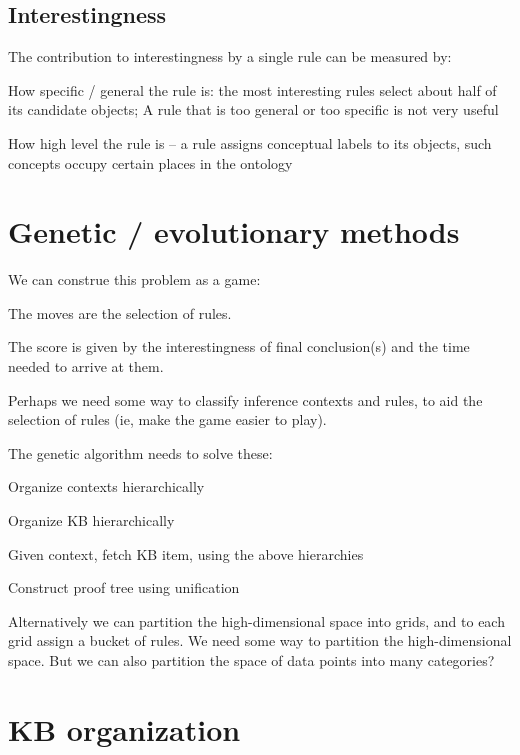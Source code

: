 \subsection{Interestingness}

The contribution to interestingness by a single rule can be measured by:
\begin{compactenum-}
\item How specific / general the rule is:  the most interesting rules select about half of its candidate objects;  A rule that is too general or too specific is not very useful
\item How high level the rule is -- a rule assigns conceptual labels to its objects, such concepts occupy certain places in the ontology
\end{compactenum-}

\section{Genetic / evolutionary methods}

We can construe this problem as a game:
\begin{compactenum-}
\item The moves are the selection of rules.
\item The score is given by the interestingness of final conclusion(s) and the time needed to arrive at them.
\item Perhaps we need some way to classify inference contexts and rules, to aid the selection of rules (ie, make the game easier to play).
\end{compactenum-}

The genetic algorithm needs to solve these:
\begin{compactenum-}
\item Organize contexts hierarchically
\item Organize KB hierarchically
\item Given context, fetch KB item, using the above hierarchies
\item Construct proof tree using unification
\end{compactenum-}

Alternatively we can partition the high-dimensional space into grids, and to each grid assign a bucket of rules.  We need some way to partition the high-dimensional space.  But we can also partition the space of data points into many categories?

\section{KB organization}


